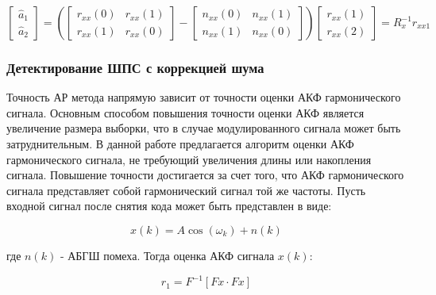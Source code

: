 \begin{center}
\begin{equation}
	\label{eq:lpc_a_estimation}
	\left[ \begin{array}{c}
		\hat{a}_1 \\
		\hat{a}_2
	\end{array} \right]
		=
		\left(
			\left[ \begin{array}{cc}
				r_{xx}(0) & r_{xx}(1) \\
				r_{xx}(1) & r_{xx}(0)
			\end{array} \right] -
			\left[ \begin{array}{cc}
				n_{xx}(0) & n_{xx}(1) \\
				n_{xx}(1) & n_{xx}(0)
			\end{array} \right] 
		\right)
		\left[ \begin{array}{c}
			r_{xx}(1) \\
			r_{xx}(2)
		\end{array} \right]
		=
		R_x^{-1}r_{xx1}
\end{equation}
\end{center}

\subsubsection{Детектирование ШПС с коррекцией шума}
Точность АР метода напрямую зависит от точности оценки АКФ гармонического сигнала. Основным способом повышения точности оценки
АКФ является увеличение размера выборки, что в случае модулированного сигнала может быть затруднительным. В данной работе
предлагается алгоритм оценки АКФ гармонического сигнала, не требующий увеличения длины или накопления сигнала.
Повышение точности достигается за счет того, что АКФ гармонического сигнала представляет собой гармонический сигнал той же частоты.
Пусть входной сигнал после снятия кода может быть представлен в виде:

\begin{center}
\begin{equation}
	x(k)=A \cos{(\omega_k)} + n(k)
\end{equation}
\end{center}

где ${n(k)}$ - АБГШ помеха. Тогда оценка АКФ сигнала ${x(k)}$:


\begin{center}
\begin{equation}
	r_1 = F^{-1}[Fx \cdot Fx]
\end{equation}
\end{center}

